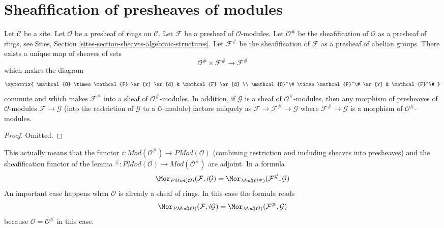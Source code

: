 \section{Sheafification of presheaves of modules}
\label{section-sheafification-presheaves-modules}

\begin{lemma}
\label{lemma-sheafification-presheaf-modules}
Let $\mathcal{C}$ be a site.
Let $\mathcal{O}$ be a presheaf of rings on $\mathcal{C}$.
Let $\mathcal{F}$ be a presheaf of $\mathcal{O}$-modules.
Let $\mathcal{O}^\#$ be the sheafification of $\mathcal{O}$ as a presheaf
of rings, see Sites, Section \ref{sites-section-sheaves-algebraic-structures}.
Let $\mathcal{F}^\#$ be the sheafification of $\mathcal{F}$
as a presheaf of abelian groups. There exists a unique map of
sheaves of sets
$$
\mathcal{O}^\# \times \mathcal{F}^\#
\longrightarrow
\mathcal{F}^\#
$$
which makes the diagram
$$
\xymatrix{
\mathcal{O} \times \mathcal{F} \ar[r] \ar[d] &
\mathcal{F} \ar[d] \\
\mathcal{O}^\# \times \mathcal{F}^\# \ar[r] &
\mathcal{F}^\#
}
$$
commute and which makes $\mathcal{F}^\#$ into a sheaf
of $\mathcal{O}^\#$-modules. In addition, if $\mathcal{G}$
is a sheaf of $\mathcal{O}^\#$-modules, then any morphism
of presheaves of $\mathcal{O}$-modules $\mathcal{F} \to \mathcal{G}$
(into the restriction of $\mathcal{G}$ to a $\mathcal{O}$-module)
factors uniquely as $\mathcal{F} \to \mathcal{F}^\# \to \mathcal{G}$
where $\mathcal{F}^\# \to \mathcal{G}$ is a morphism of
$\mathcal{O}^\#$-modules.
\end{lemma}

\begin{proof}
Omitted.
\end{proof}

\noindent
This actually means that the functor
$i : \textit{Mod}(\mathcal{O}^\#) \to \textit{PMod}(\mathcal{O})$
(combining restriction and including sheaves into presheaves)
and the sheafification functor of the lemma
${}^\# : \textit{PMod}(\mathcal{O}) \to \textit{Mod}(\mathcal{O}^\#)$
are adjoint. In a formula
$$
\Mor_{\textit{PMod}(\mathcal{O})}(\mathcal{F}, i\mathcal{G})
=
\Mor_{\textit{Mod}(\mathcal{O}^\#)}(\mathcal{F}^\#, \mathcal{G})
$$
An important case happens when $\mathcal{O}$ is already a sheaf of
rings. In this case the formula reads
$$
\Mor_{\textit{PMod}(\mathcal{O})}(\mathcal{F}, i\mathcal{G})
=
\Mor_{\textit{Mod}(\mathcal{O})}(\mathcal{F}^\#, \mathcal{G})
$$
because $\mathcal{O} = \mathcal{O}^\#$ in this case.

